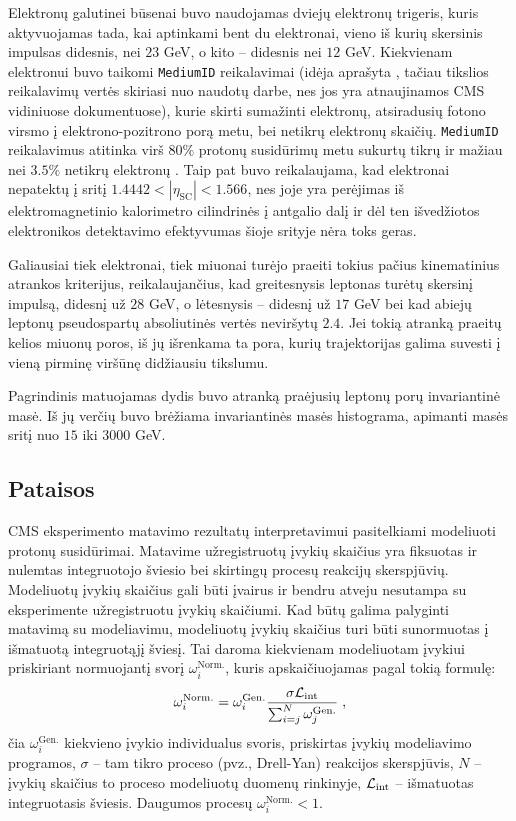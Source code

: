 \documentclass[a4paper, 12pt, twoside]{article}
\newcommand{\ttt}[1]{\texttt{#1}}
\newcommand{\Lumi}{{\cal L}_\mathrm{int}}
\newlength\q
\begin{document}
Elektronų galutinei būsenai buvo naudojamas dviejų elektronų trigeris, kuris aktyvuojamas tada, kai aptinkami
bent du elektronai, vieno iš kurių skersinis impulsas didesnis, nei $23$ GeV, o kito -- didesnis nei $12$ GeV.
Kiekvienam elektronui buvo taikomi \ttt{MediumID} reikalavimai (idėja aprašyta \cite{EleID}, tačiau tikslios
reikalavimų vertės skiriasi nuo naudotų darbe, nes jos yra atnaujinamos CMS vidiniuose dokumentuose), kurie
skirti sumažinti elektronų, atsiradusių fotono virsmo į elektrono-pozitrono porą metu, bei netikrų elektronų
skaičių.
\ttt{MediumID} reikalavimus atitinka virš $80\%$ protonų susidūrimų metu sukurtų tikrų ir mažiau nei $3.5\%$ netikrų
elektronų \cite{EleID}.
Taip pat buvo reikalaujama, kad elektronai nepatektų į sritį $1.4442<|\eta_{\mathrm{SC}}|<1.566$, nes joje
yra perėjimas iš elektromagnetinio kalorimetro cilindrinės į antgalio dalį ir dėl ten išvedžiotos elektronikos
detektavimo efektyvumas šioje srityje nėra toks geras.

Galiausiai tiek elektronai, tiek miuonai turėjo praeiti tokius pačius kinematinius atrankos kriterijus,
reikalaujančius, kad greitesnysis leptonas turėtų skersinį impulsą, didesnį už $28$ GeV, o lėtesnysis --
didesnį už $17$ GeV bei kad abiejų leptonų pseudospartų absoliutinės vertės neviršytų $2.4$.
Jei tokią atranką praeitų kelios miuonų poros, iš jų išrenkama ta pora, kurių trajektorijas galima suvesti į
vieną pirminę viršūnę didžiausiu tikslumu.

Pagrindinis matuojamas dydis buvo atranką praėjusių leptonų porų invariantinė masė.
Iš jų verčių buvo brėžiama invariantinės masės histograma, apimanti masės sritį nuo $15$ iki $3000$ GeV.


\subsection{Pataisos}\label{sec:corrections}
CMS eksperimento matavimo rezultatų interpretavimui pasitelkiami modeliuoti protonų susidūrimai.
Matavime užregistruotų įvykių skaičius yra fiksuotas ir nulemtas integruotojo šviesio bei skirtingų
procesų reakcijų skerspjūvių.
Modeliuotų įvykių skaičius gali būti įvairus ir bendru atveju nesutampa su eksperimente užregistruotu
įvykių skaičiumi.
Kad būtų galima palyginti matavimą su modeliavimu, modeliuotų įvykių skaičius turi būti sunormuotas
į išmatuotą integruotąjį šviesį.
Tai daroma kiekvienam modeliuotam įvykiui priskiriant normuojantį svorį $\omega_{i}^{\mathrm{Norm.}}$,
kuris apskaičiuojamas pagal tokią formulę:
\begin{equation}
	\omega_{i}^{\mathrm{Norm.}} = \omega_{i}^{\mathrm{Gen.}} \frac{ \sigma\Lumi }{ \sum_{i=j}^{N}\omega_{j}^{\mathrm{Gen.}} } \; ,
	\label{eq:NLOweight}
\end{equation}
čia $\omega_{i}^{\mathrm{Gen.}}$ kiekvieno įvykio individualus svoris, priskirtas įvykių modeliavimo programos,
$\sigma$ -- tam tikro proceso (pvz., Drell-Yan) reakcijos skerspjūvis, $N$ -- įvykių skaičius to
proceso modeliuotų duomenų rinkinyje, $\Lumi$ -- išmatuotas integruotasis šviesis.
Daugumos procesų $\omega_{i}^{\mathrm{Norm.}}<1$.
\end{document}
